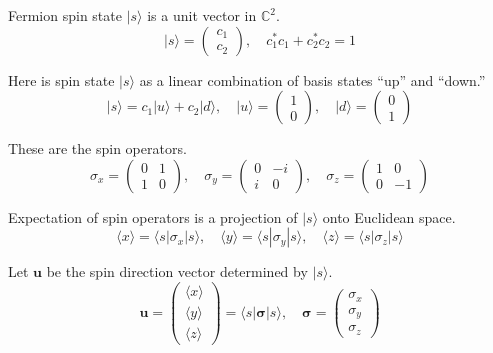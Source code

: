 \documentclass[12pt]{article}
\begin{document}
Fermion spin state $|s\rangle$ is a unit vector in $\mathbb{C}^2$.
\begin{equation*}
|s\rangle=\begin{pmatrix}c_1\\c_2\end{pmatrix},
\quad
c_1^*c_1+c_2^*c_2=1
\end{equation*}

Here is spin state $|s\rangle$ as a linear combination of basis states ``up'' and ``down.''
\begin{equation*}
|s\rangle=c_1|u\rangle+c_2|d\rangle,
\quad
|u\rangle=\begin{pmatrix}1\\0\end{pmatrix},
\quad
|d\rangle=\begin{pmatrix}0\\1\end{pmatrix}
\end{equation*}

These are the spin operators.
\begin{equation*}
\sigma_x=\begin{pmatrix}0&1\\1&0\end{pmatrix},
\quad
\sigma_y=\begin{pmatrix}0&-i\\i&0\end{pmatrix},
\quad
\sigma_z=\begin{pmatrix}1&0\\0&-1\end{pmatrix}
\end{equation*}

Expectation of spin operators is a projection of $|s\rangle$ onto Euclidean space.
\begin{equation*}
\langle x\rangle=\langle s|\sigma_x|s\rangle,
\quad
\langle y\rangle=\langle s|\sigma_y|s\rangle,
\quad
\langle z\rangle=\langle s|\sigma_z|s\rangle
\end{equation*}

Let $\mathbf u$ be the spin direction vector determined by $|s\rangle$.
\begin{equation*}
\mathbf u=\begin{pmatrix}\langle x\rangle\\\langle y\rangle\\\langle z\rangle\end{pmatrix}
=\langle s|\boldsymbol\sigma|s\rangle,
\quad
\boldsymbol\sigma=\begin{pmatrix}\sigma_x\\\sigma_y\\\sigma_z\end{pmatrix}
\end{equation*}
\end{document}
